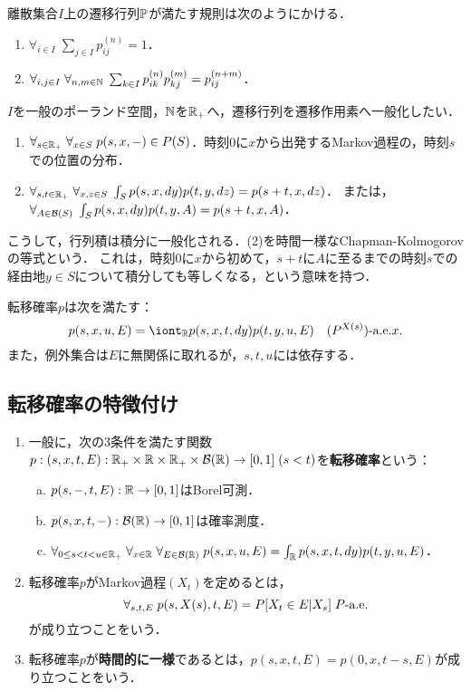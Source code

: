 \documentclass[uplatex,dvipdfmx]{jsreport}
\begin{document}
\begin{discussion}
    離散集合$I$上の遷移行列$\mathbb{P}$が満たす規則は次のようにかける．
    \begin{enumerate}
        \item $\forall_{i\in I}\;\sum_{j\in I}p_{ij}^{(n)}=1$．
        \item $\forall_{i,j\in I}\;\forall_{n,m\in\mathbb{N}}\;\sum_{k\in I}p_{ik}^{(n)}p_{kj}^{(m)}=p_{ij}^{(n+m)}$．
    \end{enumerate}
    $I$を一般のポーランド空間，$\mathbb{N}$を$\mathbb{R}_+$へ，遷移行列を遷移作用素へ一般化したい．
    \begin{enumerate}
        \item $\forall_{s\in\mathbb{R}_+}\;\forall_{x\in S}\;p(s,x,-)\in P(S)$．時刻$0$に$x$から出発するMarkov過程の，時刻$s$での位置の分布．
        \item $\forall_{s,t\in\mathbb{R}_+}\;\forall_{x,z\in S}\;\int_Sp(s,x,dy)p(t,y,dz)=p(s+t,x,dz)$．
        または，$\forall_{A\in\mathcal{B}(S)}\;\int_Sp(s,x,dy)p(t,y,A)=p(s+t,x,A)$．
    \end{enumerate}
    こうして，行列積は積分に一般化される．(2)を時間一様なChapman-Kolmogorovの等式という．
    これは，時刻$0$に$x$から初めて，$s+t$に$A$に至るまでの時刻$s$での経由地$y\in S$について積分しても等しくなる，という意味を持つ．
\end{discussion}

\begin{lemma}
    転移確率$p$は次を満たす：
    \[p(s,x,u,E)=\iont_\R p(s,x,t,dy)p(t,y,u,E)\quad(P^{X(s)})\dae x.\]
    また，例外集合は$E$に無関係に取れるが，$s,t,u$には依存する．
\end{lemma}

\subsection{転移確率の特徴付け}

\begin{definition}\mbox{}
    \begin{enumerate}
        \item 一般に，次の3条件を満たす関数$p:(s,x,t,E):\mathbb{R}_+\times\mathbb{R}\times\mathbb{R}_+\times\mathcal{B}(\mathbb{R})\to[0,1]\;(s<t)$を\textbf{転移確率}という：
        \begin{enumerate}[(a)]
            \item $p(s,-,t,E):\mathbb{R}\to[0,1]$はBorel可測．
            \item $p(s,x,t,-):\mathcal{B}(\mathbb{R})\to[0,1]$は確率測度．
            \item $\forall_{0\le s<t<u\in\mathbb{R}_+}\;\forall_{x\in\mathbb{R}}\;\forall_{E\in\mathcal{B}(\mathbb{R})}\;p(s,x,u,E)=\int_{\mathbb{R}} p(s,x,t,dy)p(t,y,u,E)$．
        \end{enumerate}
        \item 転移確率$p$がMarkov過程$(X_t)$を定めるとは，
        \[\forall_{s,t,E}\;p(s,X(s),t,E)=P[X_t\in E|X_s]\;P\text{-a.e.}\]
        が成り立つことをいう．
        \item 転移確率$p$が\textbf{時間的に一様}であるとは，$p(s,x,t,E)=p(0,x,t-s,E)$が成り立つことをいう．
    \end{enumerate}
\end{definition}
\end{document}
